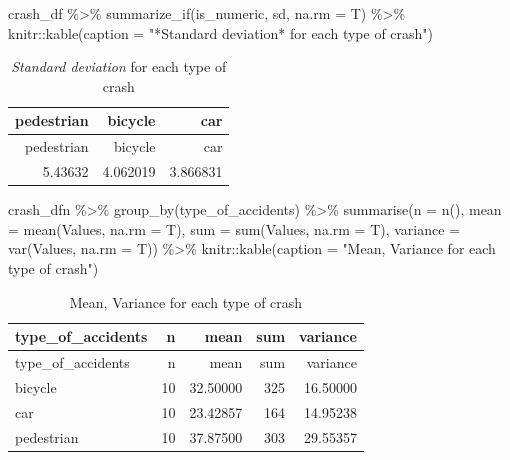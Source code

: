\documentclass[
]{article}
\newenvironment{Shaded}{\begin{snugshade}}{\end{snugshade}}
\newcommand{\AttributeTok}[1]{\textcolor[rgb]{0.77,0.63,0.00}{#1}}
\newcommand{\FunctionTok}[1]{\textcolor[rgb]{0.00,0.00,0.00}{#1}}
\newcommand{\NormalTok}[1]{#1}
\newcommand{\SpecialCharTok}[1]{\textcolor[rgb]{0.00,0.00,0.00}{#1}}
\newcommand{\StringTok}[1]{\textcolor[rgb]{0.31,0.60,0.02}{#1}}
\begin{document}
\begin{Shaded}
\begin{Highlighting}[]
\NormalTok{crash\_df }\SpecialCharTok{\%\textgreater{}\%} 
  \FunctionTok{summarize\_if}\NormalTok{(is\_numeric, sd, }\AttributeTok{na.rm =}\NormalTok{ T) }\SpecialCharTok{\%\textgreater{}\%}
\NormalTok{  knitr}\SpecialCharTok{::}\FunctionTok{kable}\NormalTok{(}\AttributeTok{caption =} \StringTok{"*Standard deviation* for each type of crash"}\NormalTok{)}
\end{Highlighting}
\end{Shaded}

\begin{longtable}[]{@{}rrr@{}}
\caption{\emph{Standard deviation} for each type of
crash}\tabularnewline
\toprule
pedestrian & bicycle & car \\
\midrule
\endfirsthead
\toprule
pedestrian & bicycle & car \\
\midrule
\endhead
5.43632 & 4.062019 & 3.866831 \\
\bottomrule
\end{longtable}

\begin{Shaded}
\begin{Highlighting}[]
\NormalTok{crash\_dfn }\SpecialCharTok{\%\textgreater{}\%} 
  \FunctionTok{group\_by}\NormalTok{(type\_of\_accidents) }\SpecialCharTok{\%\textgreater{}\%} 
  \FunctionTok{summarise}\NormalTok{(}\AttributeTok{n =} \FunctionTok{n}\NormalTok{(), }\AttributeTok{mean =} \FunctionTok{mean}\NormalTok{(Values, }\AttributeTok{na.rm =}\NormalTok{ T), }
            \AttributeTok{sum =} \FunctionTok{sum}\NormalTok{(Values, }\AttributeTok{na.rm =}\NormalTok{ T), }\AttributeTok{variance =} \FunctionTok{var}\NormalTok{(Values, }\AttributeTok{na.rm =}\NormalTok{ T)) }\SpecialCharTok{\%\textgreater{}\%}
\NormalTok{  knitr}\SpecialCharTok{::}\FunctionTok{kable}\NormalTok{(}\AttributeTok{caption =} \StringTok{"Mean, Variance for each type of crash"}\NormalTok{)}
\end{Highlighting}
\end{Shaded}

\begin{longtable}[]{@{}lrrrr@{}}
\caption{Mean, Variance for each type of crash}\tabularnewline
\toprule
type\_of\_accidents & n & mean & sum & variance \\
\midrule
\endfirsthead
\toprule
type\_of\_accidents & n & mean & sum & variance \\
\midrule
\endhead
bicycle & 10 & 32.50000 & 325 & 16.50000 \\
car & 10 & 23.42857 & 164 & 14.95238 \\
pedestrian & 10 & 37.87500 & 303 & 29.55357 \\
\bottomrule
\end{longtable}
\end{document}
